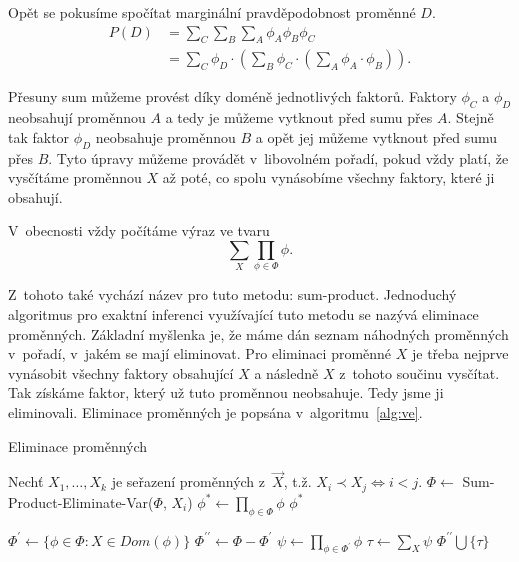 Opět se pokusíme spočítat marginální pravděpodobnost proměnné $D$.
\begin{align}
P(D) &= \sum_C \sum_B \sum_A \phi_A \phi_B \phi_C
\\
&= \sum_C 
	\phi_D \cdot 
	\left( 
		\sum_B 
			\phi_C \cdot 
			\left( 
				\sum_A 
					\phi_A \cdot \phi_B
			\right)
	\right).
\end{align}

Přesuny sum můžeme provést díky doméně jednotlivých faktorů.
Faktory $\phi_C$ a $\phi_D$ neobsahují proměnnou $A$ a tedy je můžeme vytknout před sumu přes $A$.
Stejně tak faktor $\phi_D$ neobsahuje proměnnou $B$ a opět jej můžeme vytknout před sumu přes $B$.
Tyto úpravy můžeme provádět v~libovolném pořadí, pokud vždy platí, že vysčítáme proměnnou $X$ až poté, co spolu vynásobíme všechny faktory, které ji obsahují.

V~obecnosti vždy počítáme výraz ve tvaru
\[
\sum_X \prod_{\phi \in \Phi} \phi.
\]

Z~tohoto také vychází název pro tuto metodu: sum-product.
Jednoduchý algoritmus pro exaktní inferenci využívající tuto metodu se nazývá eliminace proměnných.
Základní myšlenka je, že máme dán seznam náhodných proměnných v~pořadí, v~jakém se mají eliminovat.
Pro eliminaci proměnné $X$ je třeba nejprve vynásobit všechny faktory obsahující $X$ a následně $X$ z~tohoto součinu vysčítat.
Tak získáme faktor, který už tuto proměnnou neobsahuje.
Tedy jsme ji eliminovali.
Eliminace proměnných je popsána v~algoritmu~\ref{alg:ve}.

\begin{algorithm}[H]
\caption{Eliminace proměnných}
\label{alg:ve}
\begin{algorithmic}
\State

\State Nechť $X_1, \dots, X_k$ je seřazení proměnných z~$\vec{X}$, t.ž. $X_i \prec X_j \Leftrightarrow i < j$.
	\State $\Phi \gets$ Sum-Product-Eliminate-Var($\Phi$, $X_i$)
\EndFor
\State $\phi^* \gets \prod_{\phi \in \Phi} \phi$
\State \Return $\phi^*$
\EndFunction
\State
{}
\State

\State $\Phi^\prime \gets \{\phi \in \Phi: X \in Dom(\phi)\}$
\State $\Phi^{\prime \prime} \gets \Phi - \Phi^\prime$
\State $\psi \gets \prod_{\phi \in \Phi^\prime} \phi$
\State $\tau \gets \sum_X \psi$
\State \Return $\Phi^{\prime\prime} \bigcup \{\tau\}$
\EndFunction
\end{algorithmic}
\end{algorithm}

